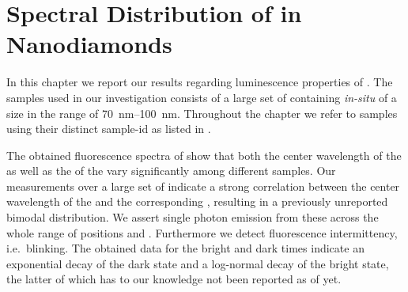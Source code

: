 
\chapter[Spectral Distribution]{Spectral Distribution of \sivs in Nanodiamonds}	\label{ch::distribution}

	In this chapter we report our results regarding luminescence properties of \sivs. The samples used in our investigation consists of a large set of \CVD \nds containing \textit{in-situ} \sivs of a size in the range of \SIrange{70}{100}{\nm}. Throughout the chapter we refer to samples using their distinct sample-id as listed in .

	The obtained fluorescence spectra of \sivs show that both the center wavelength of the \ZPL as well as the \lw of the \zpl vary significantly among different samples.
	Our measurements over a large set of \sivs indicate a strong correlation between the center wavelength of the \zpl and the corresponding \lws, resulting in a previously unreported bimodal distribution.
	We assert single photon emission from these \sivs across the whole range of \zpl positions and \lws.
	Furthermore we detect fluorescence intermittency, i.e.\ blinking. The obtained data for the bright and dark times indicate
	an exponential decay of the dark state and a log-normal decay of the bright state, the latter of which has to our knowledge not been reported as of yet.
